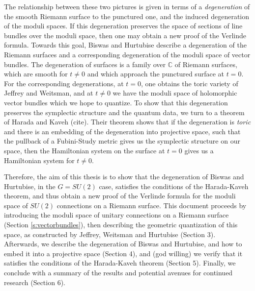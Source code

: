 	The relationship between these two pictures is given in terms of a \textit{degeneration} of the smooth Riemann surface to the punctured one, and the induced degeneration of the moduli spaces. If this degeneration preserves the space of sections of line bundles over the moduli space, then one may obtain a new proof of the Verlinde formula. Towards this goal, Biswas and Hurtubise describe a degeneration of the Riemann surfaces and a corresponding degeneration of the moduli space of vector bundles. The degeneration of surfaces is a family over $\mathbb{C}$ of Riemann surfaces, which are smooth for $t\neq0$ and which approach the punctured surface at $t=0$. For the corresponding degenerations, at $t=0$, one obtains the toric variety of Jeffrey and Weitsman, and at $t\neq 0$ we have the moduli space of holomorphic vector bundles which we hope to quantize. To show that this degeneration preserves the symplectic structure and the quantum data, we turn to a theorem of Harada and Kaveh (cite). Their theorem shows that if the degeneration is \textit{toric} and there is an embedding of the degeneration into projective space, such that the pullback of a Fubini-Study metric gives us the symplectic structure on our space, then the Hamiltonian system on the surface at $t=0$ gives us a Hamiltonian system for $t\neq 0$. 
	
	Therefore, the aim of this thesis is to show that the degeneration of Biswas and Hurtubise, in the $G=SU(2)$ case, satisfies the conditions of the Harada-Kaveh theorem, and thus obtain a new proof of the Verlinde formula for the moduli space of $SU(2)$ connections on a Riemann surface. This document proceeds by introducing the moduli space of unitary connections on a Riemann surface (Section \ref{s:vectorbundles}), then describing the geometric quantization of this space, as constructed by Jeffrey, Weitsman and Hurtubise (Section 3). Afterwards, we describe the degeneration of Biswas and Hurtubise, and how to embed it into a projective space (Section 4), and (god willing) we verify that it satisfies the conditions of the Harada-Kaveh theorem (Section 5). Finally, we conclude with a summary of the results and potential avenues for continued research (Section 6).

